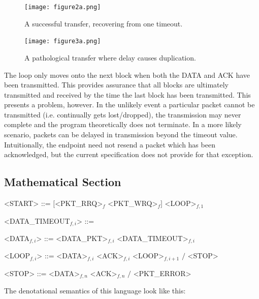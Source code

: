 \documentclass[a0,landscape]{a0poster}
\begin{document}
\begin{multicols}{4}
\begin{minipage}{\linewidth}
\centering
  \begin{minipage}{0.45\linewidth}
    \centering
    \begin{figure}[H]
    \centering
      \texttt{[image: figure2a.png]}
      \caption{A successful transfer, recovering from one timeout.}
    \end{figure}
  \end{minipage}
  \begin{minipage}{0.45\linewidth}
    \centering
    \begin{figure}[H]
    \centering
      \texttt{[image: figure3a.png]}
      \caption{A pathological transfer where delay causes duplication.}
    \end{figure}
  \end{minipage}
\end{minipage}

The loop only moves onto the next block when both the DATA and ACK have been transmitted. This provides assurance that all blocks are ultimately transmitted and received by the time the last block has been transmitted. This presents a problem, however. In the unlikely event a particular packet cannot be transmitted (i.e. continually gets lost/dropped), the transmission may never complete and the program theoretically does not terminate. In a more likely scenario, packets can be delayed in transmission beyond the timeout value. Intuitionally, the endpoint need not resend a packet which has been acknowledged, but the current specification does not provide for that exception.

\subsection*{Mathematical Section}

\begin{grammar}
<START> ::= $\big[$<PKT\_RRQ>$_{f}$ <PKT\_WRQ>$_{f}\big]$ <LOOP>$_{f,1}$

<DATA\_TIMEOUT$_{f,i}$> ::= 

<DATA$_{f,i}$> ::= <DATA\_PKT>$_{f,i}$ <DATA\_TIMEOUT>$_{f,i}$

<LOOP$_{f,i}$> ::= <DATA>$_{f,i}$ <ACK>$_{f,i}$ <LOOP>$_{f,i+1}$ $\big/$ <STOP>

<STOP> ::= <DATA>$_{f,n}$ <ACK>$_{f,n}$ $\big/$ <PKT\_ERROR>
\end{grammar}

The denotational semantics of this language look like this:


\end{multicols}
\end{document}
